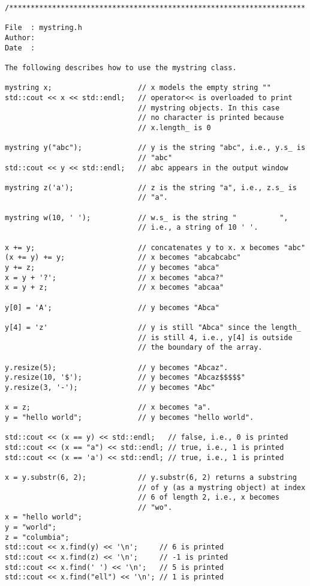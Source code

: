 {\small
\begin{Verbatim}[frame=single]
/*********************************************************************

File  : mystring.h
Author:
Date  :

The following describes how to use the mystring class.

mystring x;                    // x models the empty string ""
std::cout << x << std::endl;   // operator<< is overloaded to print
                               // mystring objects. In this case
                               // no character is printed because 
                               // x.length_ is 0

mystring y("abc");             // y is the string "abc", i.e., y.s_ is
                               // "abc"
std::cout << y << std::endl;   // abc appears in the output window

mystring z('a');               // z is the string "a", i.e., z.s_ is
                               // "a".

mystring w(10, ' ');           // w.s_ is the string "          ",
                               // i.e., a string of 10 ' '.

x += y;                        // concatenates y to x. x becomes "abc"
(x += y) += y;                 // x becomes "abcabcabc"
y += z;                        // y becomes "abca"
x = y + '?';                   // x becomes "abca?"
x = y + z;                     // x becomes "abcaa"

y[0] = 'A';                    // y becomes "Abca"

y[4] = 'z'                     // y is still "Abca" since the length_
                               // is still 4, i.e., y[4] is outside
                               // the boundary of the array.

y.resize(5);                   // y becomes "Abcaz".
y.resize(10, '$');             // y becomes "Abcaz$$$$$"
y.resize(3, '-');              // y becomes "Abc"

x = z;                         // x becomes "a".
y = "hello world";             // y becomes "hello world".

std::cout << (x == y) << std::endl;   // false, i.e., 0 is printed
std::cout << (x == "a") << std::endl; // true, i.e., 1 is printed
std::cout << (x == 'a') << std::endl; // true, i.e., 1 is printed

x = y.substr(6, 2);            // y.substr(6, 2) returns a substring
                               // of y (as a mystring object) at index
                               // 6 of length 2, i.e., x becomes
                               // "wo".
x = "hello world";
y = "world";
z = "columbia";
std::cout << x.find(y) << '\n';     // 6 is printed
std::cout << x.find(z) << '\n';     // -1 is printed
std::cout << x.find(' ') << '\n';   // 5 is printed
std::cout << x.find("ell") << '\n'; // 1 is printed


\end{Verbatim}}
